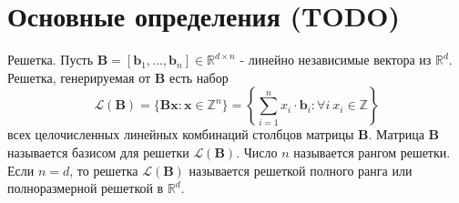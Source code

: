 \newpage

\section{Основные определения (TODO)}

Решетка. Пусть $ \mathbf{B} = [\mathbf{b}_1, ..., \mathbf{b}_n] \in \mathbb{R}^{d \times n} $ - линейно независимые вектора из $ \mathbb{R}^d $. Решетка, генерируемая от $\mathbf{B}$ есть набор $$ \mathcal{L}(\mathbf{B}) = \lbrace \mathbf{Bx}: \mathbf{x} \in \mathbb{Z}^n \rbrace = \left\{ \sum\limits_{i=1}^n x_i \cdot \mathbf{b}_i: \forall i \ x_i \in \mathbb{Z} \right\} $$
всех целочисленных линейных комбинаций столбцов матрицы $\mathbf{B}$. Матрица $\mathbf{B}$ называется базисом для решетки $\mathcal{L}(\mathbf{B})$. Число $n$ называется рангом решетки. Если $n = d$, то решетка $\mathcal{L}(\mathbf{B})$ называется решеткой полного ранга или полноразмерной решеткой в $\mathbb{R}^d$.

\clearpage